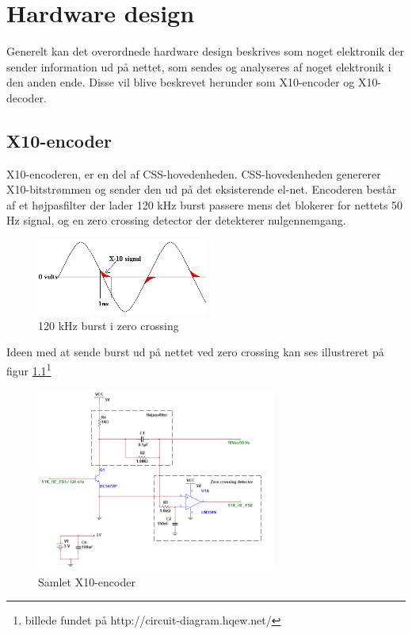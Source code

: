 \chapter{Hardware design}
Generelt kan det overordnede hardware design beskrives som noget elektronik der sender information ud på nettet, som sendes og analyseres af noget elektronik i den anden ende. Disse vil blive beskrevet herunder som X10-encoder og X10-decoder.  


\section{X10-encoder}
X10-encoderen, er en del af CSS-hovedenheden. CSS-hovedenheden genererer X10-bitstrømmen og sender den ud på det eksisterende el-net. Encoderen består af et højpasfilter der lader 120 kHz burst passere mens det blokerer for nettets 50 Hz signal, og en zero crossing detector der detekterer nulgennemgang.

\begin{figure}[H]
	\centering
	\includegraphics[width=0.50\textwidth]{billeder/HWdesign/X10_BURST}
	\caption{120 kHz burst i zero crossing}
	\label{fig:X10_BURST}
\end{figure}

Ideen med at sende burst ud på nettet ved zero crossing kan ses illustreret på figur \ref{fig:X10_BURST}\footnote{billede fundet på http://circuit-diagram.hqew.net/}

\begin{figure}[H]
	\centering
	\includegraphics[width=0.70\textwidth]{billeder/HWdesign/Encoder}
	\caption{Samlet X10-encoder}
	\label{fig:Encoder}
\end{figure}

